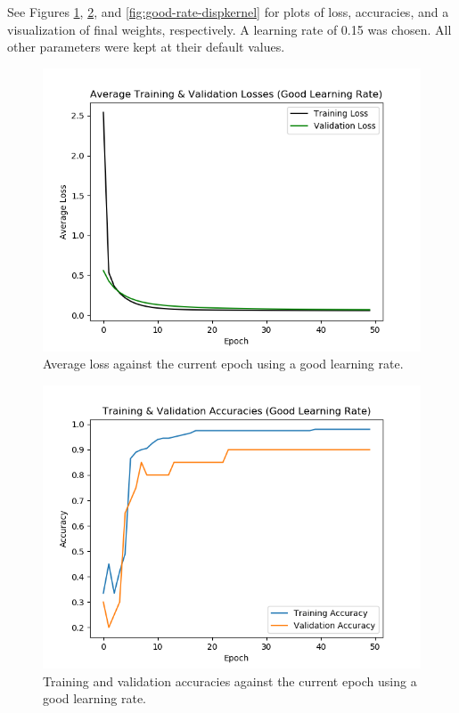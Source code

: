 \documentclass{article}
\begin{document}
\begin{enumerate}
        See Figures \ref{fig:good-rate-loss},
        \ref{fig:good-rate-accuracies}, and
        \ref{fig:good-rate-dispkernel} for plots of loss, accuracies, and a
        visualization of final weights, respectively. A learning rate of 0.15 was
        chosen. All other parameters were kept at their default values.
        \begin{figure}[ht]
          \begin{center}
            \includegraphics[width=0.7\linewidth]{figures/good-rate-loss.png}
            \caption{Average loss against the current epoch using a good learning rate.}
            \label{fig:good-rate-loss}
          \end{center}
        \end{figure}
        \begin{figure}[ht]
          \begin{center}
            \includegraphics[width=0.7\linewidth]{figures/good-rate-accuracies.png}
            \caption{Training and validation accuracies against the current epoch using
              a good learning rate.}
            \label{fig:good-rate-accuracies}
          \end{center}
        \end{figure}

\end{enumerate}
\end{document}
